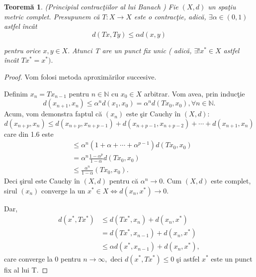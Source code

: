 \documentclass[a4paper,12pt,oneside]{report}
\newtheorem{theorem}{Teorem\u a}
\begin{document}
\begin{theorem}
(Principiul contrac\c{t}iilor al lui Banach ) Fie \(\left ( X,d \right )\) un spa\c{t}iu metric complet. Presupunem c\u{a}  \(T : X \rightarrow X\) este o contrac\c{t}ie, adic\u{a}, \(\exists \alpha  \in \left ( 0,1 \right ) \) astfel \^{i}nc\^{a}t
\[d\left ( Tx, Ty  \right ) \leq \alpha d\left ( x,y \right )\]

 pentru orice \(x,y \in X.\) Atunci T are un punct fix unic ( adic\u{a}, \(\exists ! x^{\ast } \in X\) astfel \^{i}nc\^{a}t \(T x^{\ast }  = x^{\ast }).\)
\end{theorem}
\begin{proof}
Vom folosi metoda aproxim\u{a}rilor succesive.

Definim \(x_{n} = Tx_{n - 1}\) pentru \(n \in \mathbb{N}\) cu \(x_{0} \in X\) arbitrar. Vom avea, prin induc\c{t}ie
\begin{displaymath}
  d\left ( x_{n + 1}, x_{n} \right ) \leq  \alpha ^{n}d\left ( x_{1}, x_{0} \right ) = \alpha ^{n}d\left ( Tx_{0}, x_{0} \right ), \forall n \in \mathbb{N}. \label{eq:1.6} \tag{1.6}
\end{displaymath}
Acum, vom demonstra faptul c\u{a} \(\left (x_{n}  \right )\) este \c{s}ir Cauchy \^{i}n \(\left (X, d \right ):\)
\begin{displaymath}
  d\left ( x_{n + p} , x_{n}\right ) \leq d\left ( x_{n + p} , x_{n + p - 1}\right ) + d\left ( x_{n + p - 1} , x_{n + p -2}\right ) + \cdots +d\left ( x_{n + 1} , x_{n}\right )
\end{displaymath}
care din 1.6 este
\begin{equation}\nonumber
    \begin{split}
          & \leq \alpha ^{n}\left ( 1 + \alpha  + \cdots +\alpha ^{p-1} \right )d\left ( Tx_{0}, x_{0} \right ) \\ &  =\alpha  ^{n}\frac{1 -\alpha ^{p}}{1-\alpha }d\left ( Tx_{0}, x_{0} \right ) \\ &   \leq  \frac{\alpha ^{n}}{1-\alpha }\left ( Tx_{0}, x_{0} \right ).
    \end{split}
\end{equation}
Deci \c{s}irul este  Cauchy \^{i}n \(\left ( X,d \right )\) pentru c\u{a} \(\alpha ^{n}\rightarrow 0.\) Cum \(\left ( X,d \right )\) este complet, sirul  \(\left (x_{n}  \right )\) converge la un \(x^{\ast } \in X \Leftrightarrow d\left ( x_{n} ,x^{\ast }\right ) \rightarrow 0.\)

Dar,
\begin{equation} \nonumber
    \begin{split}
        d\left ( x^{\ast }, Tx^{\ast } \right ) &   \leq  d\left ( Tx^{\ast } , x_{n}\right ) + d\left ( x_{n},x^{\ast } \right ) \\ &  =  d\left ( Tx^{\ast } , x_{n-1}\right ) + d\left ( x_{n}, x^{\ast } \right ) \\ &  \leq \alpha d\left ( x^{\ast }, x_{n-1} \right ) + d\left ( x_{n} , x^{\ast }\right ),
    \end{split}
\end{equation}
care converge la 0 pentru \(n \rightarrow \infty,\) deci \(d\left ( x^{\ast } ,Tx^{\ast }\right ) \leq 0\) \c{s}i astfel \(x^{\ast }\) este un punct fix al lui T.


\end{proof}
\end{document}
